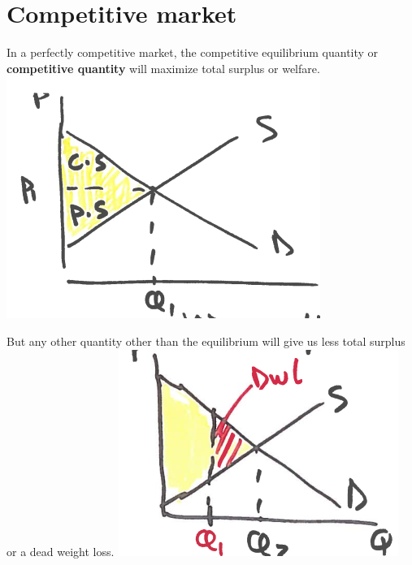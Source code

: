 \documentclass[../ECON-281-Notes.tex]{subfiles}
\begin{document}
\section{Competitive market}
In a perfectly competitive market, the competitive equilibrium quantity or \textbf{competitive quantity} will maximize total surplus or welfare.
\includegraphics[width=\columnwidth]{assets/image-2021-12-11-12-18-36.png}

But any other quantity other than the equilibrium will give us less total surplus or a dead weight loss.
\includegraphics[width=\columnwidth]{assets/image-2021-12-11-12-18-54.png}
\end{document}
